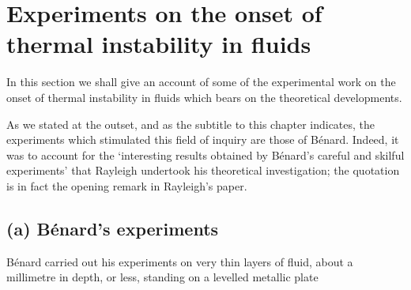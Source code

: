

\section{Experiments on the onset of thermal instability in fluids}\label{sec:18}

In this section we shall give an account of some of the experimental
work on the onset of thermal instability in fluids which bears on the
theoretical developments.

As we stated at the outset, and as the subtitle to this chapter indicates,
the experiments which stimulated this field of inquiry are those of
B\'enard.  Indeed, it was to account for the `interesting results obtained
by B\'enard's careful and skilful experiments' that Rayleigh undertook
his theoretical investigation; the quotation is in fact the opening remark
in Rayleigh's paper.


\subsection*{(a) B\'enard's experiments}

B\'enard carried out his experiments on very thin layers of fluid, about
a millimetre in depth, or less, standing on a levelled metallic plate


